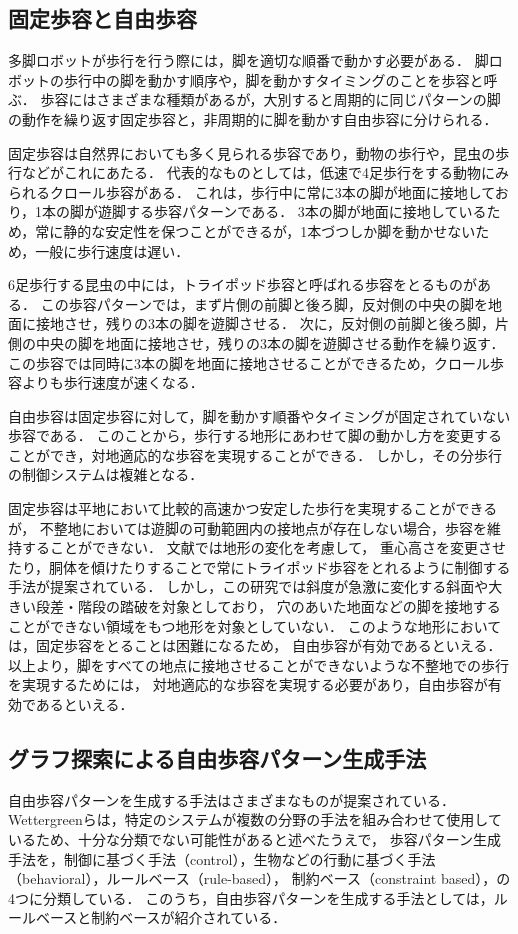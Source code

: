 \subsection{固定歩容と自由歩容}
多脚ロボットが歩行を行う際には，脚を適切な順番で動かす必要がある．
脚ロボットの歩行中の脚を動かす順序や，脚を動かすタイミングのことを歩容と呼ぶ．
歩容にはさまざまな種類があるが，大別すると周期的に同じパターンの脚の動作を繰り返す固定歩容と，非周期的に脚を動かす自由歩容に分けられる．

固定歩容は自然界においても多く見られる歩容であり，動物の歩行や，昆虫の歩行などがこれにあたる．
代表的なものとしては，低速で4足歩行をする動物にみられるクロール歩容がある．
これは，歩行中に常に3本の脚が地面に接地しており，1本の脚が遊脚する歩容パターンである．
3本の脚が地面に接地しているため，常に静的な安定性を保つことができるが，1本づつしか脚を動かせないため，一般に歩行速度は遅い．

6足歩行する昆虫の中には，トライポッド歩容と呼ばれる歩容をとるものがある．
この歩容パターンでは，まず片側の前脚と後ろ脚，反対側の中央の脚を地面に接地させ，残りの3本の脚を遊脚させる．
次に，反対側の前脚と後ろ脚，片側の中央の脚を地面に接地させ，残りの3本の脚を遊脚させる動作を繰り返す．
この歩容では同時に3本の脚を地面に接地させることができるため，クロール歩容よりも歩行速度が速くなる．

自由歩容は固定歩容に対して，脚を動かす順番やタイミングが固定されていない歩容である．
このことから，歩行する地形にあわせて脚の動かし方を変更することができ，対地適応的な歩容を実現することができる．
しかし，その分歩行の制御システムは複雑となる．

固定歩容は平地において比較的高速かつ安定した歩行を実現することができるが，
不整地においては遊脚の可動範囲内の接地点が存在しない場合，歩容を維持することができない．
文献\cite{cita:satou_tripod_gait}では地形の変化を考慮して，
重心高さを変更させたり，胴体を傾けたりすることで常にトライポッド歩容をとれるように制御する手法が提案されている．
しかし，この研究では斜度が急激に変化する斜面や大きい段差・階段の踏破を対象としており，
穴のあいた地面などの脚を接地することができない領域をもつ地形を対象としていない．
このような地形においては，固定歩容をとることは困難になるため，
自由歩容が有効であるといえる．
以上より，脚をすべての地点に接地させることができないような不整地での歩行を実現するためには，
対地適応的な歩容を実現する必要があり，自由歩容が有効であるといえる．

\subsection{グラフ探索による自由歩容パターン生成手法}
自由歩容パターンを生成する手法はさまざまなものが提案されている．
Wettergreenらは，特定のシステムが複数の分野の手法を組み合わせて使用しているため、十分な分類でない可能性があると述べたうえで，
歩容パターン生成手法を，制御に基づく手法（control），生物などの行動に基づく手法（behavioral），ルールベース（rule-based），
制約ベース（constraint based），の4つに分類している\cite{cita:wettergreen_tripod_gait}．
このうち，自由歩容パターンを生成する手法としては，ルールベースと制約ベースが紹介されている．

